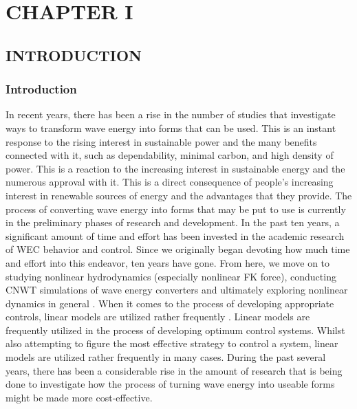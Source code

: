 \documentclass{article}
\begin{document}
\printnomenclature
\clearpage


\clearpage
{}
\setcounter{page}{1} %

\section*{\centering\fontsize{14}{16}\selectfont CHAPTER I}

\subsection*{\centering\fontsize{12}{14}\selectfont INTRODUCTION}

\subsubsection*{\fontsize{12}{14} Introduction}

\fontsize{12}{14}\selectfont
In recent years, there has been a rise in the number of studies that investigate ways to transform wave energy into forms that can be used. This is an instant response to the rising interest in sustainable power and the many benefits connected with it, such as dependability, minimal carbon, and high density of power.\cite{ref1} This is a reaction to the increasing interest in sustainable energy and the numerous approval with it. This is a direct consequence of people's increasing interest in renewable sources of energy and the advantages that they provide. The process of converting wave energy into forms that may be put to use is currently in the preliminary phases of research and development.\cite{ref2,ref3,ref4} In the past ten years, a significant amount of time and effort has been invested in the academic research of WEC behavior and control. Since we originally began devoting how much time and effort into this endeavor, ten years have gone. From here, we move on to studying nonlinear hydrodynamics (especially nonlinear FK force), conducting CNWT simulations of wave energy converters \cite{ref3} and ultimately exploring nonlinear dynamics in general \cite{ref4}. When it comes to the process of developing appropriate controls, linear models are utilized rather frequently \cite{ref5}. Linear models are frequently utilized in the process of developing optimum control systems. Whilst also attempting to figure the most effective strategy to control a system, linear models are utilized rather frequently in many cases.\cite{ref6} During the past several years, there has been a considerable rise in the amount of research that is being done to investigate how the process of turning wave energy into useable forms might be made more cost-effective.
\end{document}

